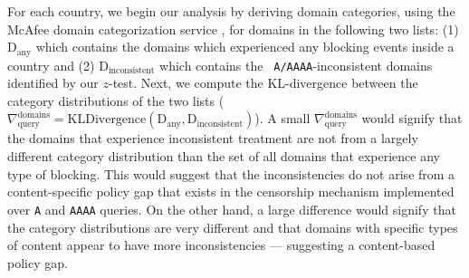 % 

For each country, we begin our analysis by deriving domain categories, using
the McAfee domain categorization service \cite{mcafee}, for domains in the
following two lists: (1) $\text{D}_{\text{any}}$ which contains
the domains which experienced any blocking events inside a country and (2)
$\text{D}_{\text{inconsistent}}$ which contains the {\tt
A/AAAA}-inconsistent domains identified by our $z$-test. Next, we compute the
KL-divergence between the category distributions of the two lists
(\ie $\nabla_{\text{query}}^{\text{domains}}
= \text{KLDivergence}(\text{D}_{\text{any}},
\text{D}_{\text{inconsistent}})$). 
%
A small $\nabla_{\text{query}}^{\text{domains}}$ would signify that the domains
that experience inconsistent treatment are not from a largely different
category distribution than the set of all domains that experience any type of
blocking. This would suggest that the inconsistencies do not arise from
a content-specific policy gap that exists in the censorship mechanism
implemented over {\tt A} and {\tt AAAA} queries. On the other hand, a large
difference would signify that the category distributions are very different and
that domains with specific types of content appear to have more
inconsistencies --- suggesting a content-based policy gap.


